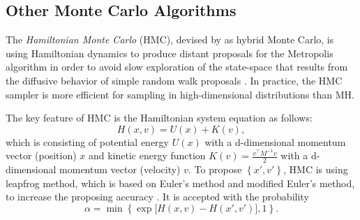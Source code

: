 %
%



\subsection*{Other Monte Carlo Algorithms}

The \textit{Hamiltonian Monte Carlo} (HMC), devised by \cite{duane1987hybrid} as hybrid Monte Carlo, is using Hamiltonian dynamics to produce distant proposals for the Metropolis algorithm in order to avoid slow exploration of the state-space that results from the diffusive behavior of simple random walk proposals \cite{neal2011mcmc}. In practice, the HMC sampler is more efficient for sampling in high-dimensional distributions than MH.

The key feature of HMC is the Hamiltonian system equation as follows: 
\begin{equation*}
H(x,v) = U(x)+K(v),
\end{equation*}
which is consisting of potential energy $U(x)$ with a d-dimensional momentum vector (position) $x$ and kinetic energy function $K(v)=\frac{v^\top M^{-1}v}{2}$ with a d-dimensional momentum vector (velocity) $v$. To propose $\left\lbrace x',v'\right\rbrace$, HMC is using leapfrog method, which is based on Euler's method and modified Euler's method, to increase the proposing accuracy \cite{betancourt2017conceptual}. It is accepted with the probability
\begin{equation*}
\alpha = \min\left\lbrace\exp\lbrack H(x,v)-H(x',v') \rbrack, 1\right\rbrace.
\end{equation*}

